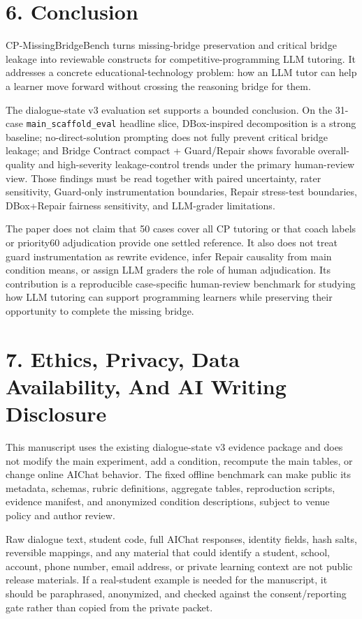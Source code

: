 \documentclass[11pt]{article}
\begin{document}
\section{6. Conclusion}

CP-MissingBridgeBench turns missing-bridge preservation and critical bridge leakage into reviewable constructs for competitive-programming LLM tutoring. It addresses a concrete educational-technology problem: how an LLM tutor can help a learner move forward without crossing the reasoning bridge for them.

The dialogue-state v3 evaluation set supports a bounded conclusion. On the 31-case \texttt{main\_scaffold\_eval} headline slice, DBox-inspired decomposition is a strong baseline; no-direct-solution prompting does not fully prevent critical bridge leakage; and Bridge Contract compact + Guard/Repair shows favorable overall-quality and high-severity leakage-control trends under the primary human-review view. Those findings must be read together with paired uncertainty, rater sensitivity, Guard-only instrumentation boundaries, Repair stress-test boundaries, DBox+Repair fairness sensitivity, and LLM-grader limitations.

The paper does not claim that 50 cases cover all CP tutoring or that coach labels or priority60 adjudication provide one settled reference. It also does not treat guard instrumentation as rewrite evidence, infer Repair causality from main condition means, or assign LLM graders the role of human adjudication. Its contribution is a reproducible case-specific human-review benchmark for studying how LLM tutoring can support programming learners while preserving their opportunity to complete the missing bridge.

\section{7. Ethics, Privacy, Data Availability, And AI Writing Disclosure}

This manuscript uses the existing dialogue-state v3 evidence package and does not modify the main experiment, add a condition, recompute the main tables, or change online AIChat behavior. The fixed offline benchmark can make public its metadata, schemas, rubric definitions, aggregate tables, reproduction scripts, evidence manifest, and anonymized condition descriptions, subject to venue policy and author review.

Raw dialogue text, student code, full AIChat responses, identity fields, hash salts, reversible mappings, and any material that could identify a student, school, account, phone number, email address, or private learning context are not public release materials. If a real-student example is needed for the manuscript, it should be paraphrased, anonymized, and checked against the consent/reporting gate rather than copied from the private packet.
\end{document}
